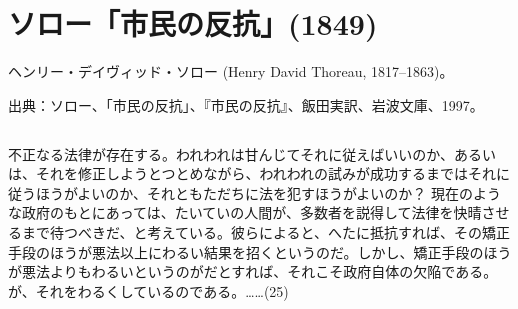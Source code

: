 






\section{ソロー「市民の反抗」(1849)}


ヘンリー・デイヴィッド・ソロー (Henry David Thoreau, 1817--1863)。


出典：ソロー、「市民の反抗」、『市民の反抗』、飯田実訳、岩波文庫、1997。

\subsection{}

不正なる法律が存在する。われわれは甘んじてそれに従えばいいのか、あるいは、それを修正しようとつとめながら、われわれの試みが成功するまではそれに従うほうがよいのか、それともただちに法を犯すほうがよいのか？ 現在のような政府のもとにあっては、たいていの人間が、多数者を説得して法律を快晴させるまで待つべきだ、と考えている。彼らによると、へたに抵抗すれば、その矯正手段のほうが悪法以上にわるい結果を招くというのだ。しかし、矯正手段のほうが悪法よりもわるいというのがだとすれば、それこそ政府自体の欠陥である。が、それをわるくしているのである。……(25)

